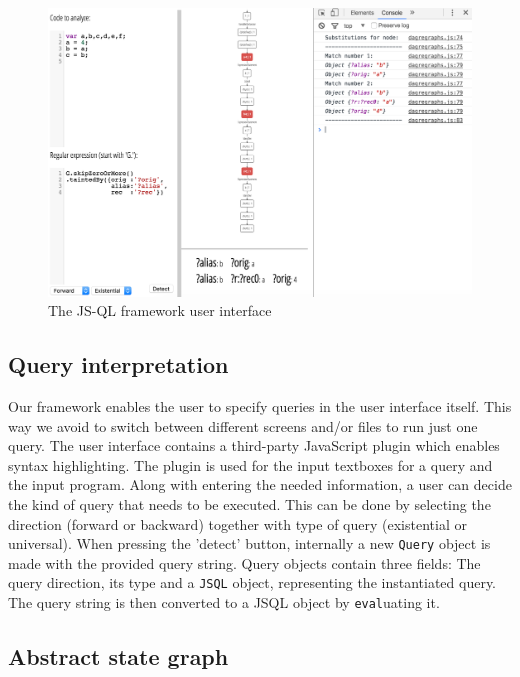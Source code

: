 \begin{figure}[h]
    \centering
      \includegraphics[width=1\textwidth]{images/UI} 
      \caption{The JS-QL framework user interface}
    \label{fig:UI}
\end{figure}

\subsection*{Query interpretation}

Our framework enables the user to specify queries in the user interface itself. This way we avoid to switch between different screens and/or files to run just one query. The user interface contains a third-party JavaScript plugin which enables syntax highlighting. The plugin is used for the input textboxes for a query and the input program. Along with entering the needed information, a user can decide the kind of query that needs to be executed. This can be done by selecting the direction (forward or backward) together with type of query (existential or universal). When pressing the 'detect' button, internally a new \texttt{Query} object is made with the provided query string. Query objects contain three fields: The query direction, its type and a \texttt{JSQL} object, representing the instantiated query. The query string is then converted to a JSQL object by \texttt{eval}uating it.

\subsection*{Abstract state graph}

